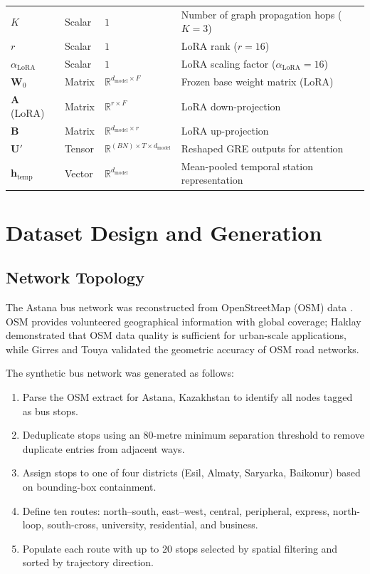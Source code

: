 \begin{table}[H]
\begin{tabular}{llll}
$K$ & Scalar & $1$ & Number of graph propagation hops ($K = 3$) \\
$r$ & Scalar & $1$ & LoRA rank ($r = 16$) \\
$\alpha_{\text{LoRA}}$ & Scalar & $1$ & LoRA scaling factor ($\alpha_{\text{LoRA}} = 16$) \\
$\mathbf{W}_0$ & Matrix & $\mathbb{R}^{d_{\text{model}} \times F}$ & Frozen base weight matrix (LoRA) \\
$\mathbf{A}$ (LoRA) & Matrix & $\mathbb{R}^{r \times F}$ & LoRA down-projection \\
$\mathbf{B}$ & Matrix & $\mathbb{R}^{d_{\text{model}} \times r}$ & LoRA up-projection \\
$\mathbf{U}'$ & Tensor & $\mathbb{R}^{(BN) \times T \times d_{\text{model}}}$ & Reshaped GRE outputs for attention \\
$\mathbf{h}_{\text{temp}}$ & Vector & $\mathbb{R}^{d_{\text{model}}}$ & Mean-pooled temporal station representation \\
\bottomrule
\end{tabular}
\end{table}

\section{Dataset Design and Generation}
\label{sec:dataset}

\subsection{Network Topology}

The Astana bus network was reconstructed from OpenStreetMap (OSM) data \cite{haklay2010openstreetmap,girres2010quality}. OSM provides volunteered geographical information with global coverage; Haklay \cite{haklay2010openstreetmap} demonstrated that OSM data quality is sufficient for urban-scale applications, while Girres and Touya \cite{girres2010quality} validated the geometric accuracy of OSM road networks.

The synthetic bus network was generated as follows:
\begin{enumerate}
    \item Parse the OSM extract for Astana, Kazakhstan to identify all nodes tagged as bus stops.
    \item Deduplicate stops using an 80-metre minimum separation threshold to remove duplicate entries from adjacent ways.
    \item Assign stops to one of four districts (Esil, Almaty, Saryarka, Baikonur) based on bounding-box containment.
    \item Define ten routes: north--south, east--west, central, peripheral, express, north-loop, south-cross, university, residential, and business.
    \item Populate each route with up to 20 stops selected by spatial filtering and sorted by trajectory direction.
\end{enumerate}

